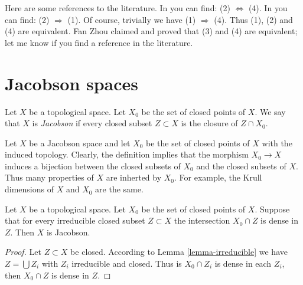 \begin{remark}
\label{remark-proof-literature}
Here are some references to the literature.
In \cite[I, p. 75, Theorem 1]{Bourbaki} you can find:
(2) $\Leftrightarrow$ (4).
In \cite[I, p. 77, Proposition 6]{Bourbaki} you can find:
(2) $\Rightarrow$ (1).
Of course, trivially we have (1) $\Rightarrow$ (4).
Thus (1), (2) and (4) are equivalent.
Fan Zhou claimed and proved that (3) and (4) are equivalent;
let me know if you find a reference in the literature.
\end{remark}

















\section{Jacobson spaces}
\label{section-space-jacobson}

\begin{definition}
\label{definition-space-jacobson}
Let $X$ be a topological space.
Let $X_0$ be the set of closed points of $X$.
We say that $X$ is {\it Jacobson} if every
closed subset $Z \subset X$ is the closure
of $Z \cap X_0$.
\end{definition}

\noindent
Let $X$ be a Jacobson space and let $X_0$ be the set
of closed points of $X$ with the induced topology.
Clearly, the definition implies that the morphism
$X_0 \to X$ induces a bijection between the closed
subsets of $X_0$ and the closed subsets of $X$.
Thus many properties of $X$ are inherted by $X_0$.
For example, the Krull dimensions of $X$ and $X_0$
are the same.

\begin{lemma}
\label{lemma-jacobson-check-irreducible-closed}
Let $X$ be a topological space. Let $X_0$ be the set
of closed points of $X$.
Suppose that for every irreducible closed subset $Z \subset X$
the intersection $X_0 \cap Z$ is dense in $Z$.
Then $X$ is Jacobson.
\end{lemma}

\begin{proof}
Let $Z \subset X$ be closed. According to Lemma \ref{lemma-irreducible}
we have $Z = \bigcup Z_i$ with $Z_i$ irreducible and closed.
Thus is $X_0 \cap Z_i$ is dense in each $Z_i$, then $X_0 \cap Z$
is dense in $Z$.
\end{proof}

